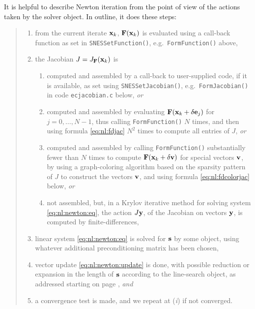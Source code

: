 It is helpful to describe Newton iteration from the point of view of the actions taken by the \pSNES solver object.  In outline, it does these steps:
\begin{quote}
	\renewcommand{\labelenumi}{(\emph{\roman{enumi}})}
	\renewcommand{\labelenumii}{\emph{\alph{enumii}}.}
	\begin{enumerate}
	\item from the current iterate $\mathbf{x}_k$, $\mathbf{F}(\mathbf{x}_k)$ is evaluated using a call-back function as set in \texttt{SNESSetFunction()}, e.g.~\texttt{FormFunction()} above,
	\item the Jacobian $J=J_{\mathbf{F}}(\mathbf{x}_k)$ is
	    \begin{enumerate}
	    \item computed and assembled by a call-back to user-supplied code, if it is available, as set using \texttt{SNESSetJacobian()}, e.g.~\texttt{FormJacobian()} in code \texttt{ecjacobian.c} below, \emph{or}
	    \item computed and assembled by evaluating $\mathbf{F}(\mathbf{x}_k+\delta \mathbf{e}_j)$ for $j=0,\dots,N-1$, thus  calling \texttt{FormFunction()} $N$ times, and then using formula \eqref{eq:nl:fdjac} $N^2$ times to compute all entries of $J$, \emph{or}
	    \item computed and assembled by calling \texttt{FormFunction()} substantially fewer than $N$ times to compute $\mathbf{F}(\mathbf{x}_k+\delta \mathbf{v})$ for special vectors $\mathbf{v}$, by using a graph-coloring algorithm based on the sparsity pattern of $J$ to construct the vectors $\mathbf{v}$, and using formula \eqref{eq:nl:fdcolorjac} below, \emph{or}
	    \item not assembled, but, in a Krylov iterative method for solving system \eqref{eq:nl:newton:eq}, the action $J \mathbf{y}$, of the Jacobian on vectors $\mathbf{y}$, is computed by finite-differences,
        \end{enumerate}
	\item linear system \eqref{eq:nl:newton:eq} is solved for $\mathbf{s}$ by some \pKSP object, using whatever additional preconditioning matrix has been chosen,
	\item vector update \eqref{eq:nl:newton:update} is done, with possible reduction or expansion in the length of $\mathbf{s}$ according to the line-search object, as addressed starting on page \pageref{sec:linesearch}, \emph{and}
	\item a convergence test is made, and we repeat at (\emph{i}) if not converged.
	\end{enumerate}
\end{quote}

